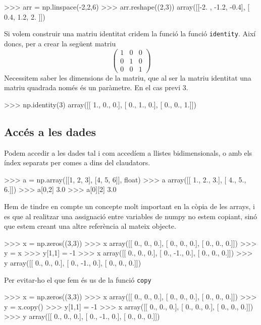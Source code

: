 \begin{tip}[caption=Combinació de linspace() i reshape()]
>>> arr = np.linspace(-2,2,6)
>>> arr.reshape((2,3))
array([[-2. , -1.2, -0.4],
       [ 0.4,  1.2,  2. ]])
\end{tip}


Si volem construir una matriu identitat cridem la funció la funció {\tt identity}. Així doncs, per a crear la següent matriu
\[ \left( \begin{array}{ccc}
1 & 0 & 0 \\
0 & 1 & 0 \\
0 & 0 & 1 \end{array} \right)\] 
Necessitem saber les dimensions de la matriu, que al ser la matriu identitat una matriu quadrada només és un paràmetre. En el cas previ 3.
\begin{blockcode}
>>> np.identity(3)
array([[ 1.,  0.,  0.],
       [ 0.,  1.,  0.],
       [ 0.,  0.,  1.]])
\end{blockcode}
\subsection{Accés a les dades}
Podem accedir a les dades tal i com accedíem a llistes bidimensionals, o amb els índex separats per comes a dins del claudators.
\begin{blockcode}
>>> a = np.array([[1, 2, 3], [4, 5, 6]], float)
>>> a
array([[ 1.,  2.,  3.],
       [ 4.,  5.,  6.]])
>>> a[0,2]
3.0
>>> a[0][2]
3.0
\end{blockcode}
Hem de tindre en compte un concepte molt important en la còpia de les arrays, i es que al realitzar una assignació entre variables de numpy no estem copiant, sinó que estem creant una altre referència al mateix objecte.
\begin{blockcode}
>>> x = np.zeros((3,3))
>>> x
array([[ 0.,  0.,  0.],
       [ 0.,  0.,  0.],
       [ 0.,  0.,  0.]])
>>> y = x
>>> y[1,1] = -1
>>> x
array([[ 0.,  0.,  0.],
       [ 0., -1.,  0.],
       [ 0.,  0.,  0.]])
>>> y
array([[ 0.,  0.,  0.],
       [ 0., -1.,  0.],
       [ 0.,  0.,  0.]])
\end{blockcode}
Per evitar-ho el que fem és us de la funció {\tt copy}


\begin{tip}[caption=Còpia per valor mitjançant la funció copy()]
>>> x = np.zeros((3,3))
>>> x
array([[ 0.,  0.,  0.],
       [ 0.,  0.,  0.],
       [ 0.,  0.,  0.]])
>>> y = x.copy()
>>> y[1,1] = -1
>>> x
array([[ 0.,  0.,  0.],
       [ 0.,  0.,  0.],
       [ 0.,  0.,  0.]])
>>> y
array([[ 0.,  0.,  0.],
       [ 0., -1.,  0.],
       [ 0.,  0.,  0.]])
\end{tip}


